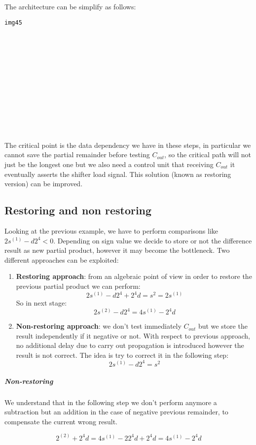 The architecture can be simplify as follows:

\begin{verbatim}
img45














\end{verbatim}

The critical point is the data dependency we have in these steps, in particular we cannot save the partial remainder before testing $C_{out}$, so the critical path will not just be the longest one but we also need a control unit that receiving $C_{out}$ it eventually asserts the shifter load signal. This solution (known as restoring version) can be improved.

\subsection{Restoring and non restoring}

Looking at the previous example, we have to perform comparisons like
$2s^{(1)}-d2^4 <0$. Depending on sign value we decide to store or not the difference result as new partial product, however it may become the bottleneck. Two different approaches can be exploited:

\begin{enumerate}
  \item \textbf{Restoring approach}: from an algebraic point of view in order to restore the previous partial product we can perform:
  $$ 2s^{(1)}-d2^4+2^4d=s^{2}=2s^{(1)}$$
  So in next stage:
  $$ 2s^{(2)}-d2^4=4s^{(1)}-2^4 d$$

  \item \textbf{Non-restoring approach}: we don't test immediately $C_{out}$ but we store the result independently if it negative or not. With respect to previous approach, no additional delay due to carry out propagation is introduced however the result is not correct. The idea is try to correct it in the following step:
  $$2s^{(1)}-d2^4=s^{2}$$
\end{enumerate}

\subparagraph{Non-restoring}
We understand that in the following step we don't perform anymore a subtraction but an addition in the case of negative previous remainder, to compensate the current wrong result.

$$2^{(2)}+2^4 d=4s^{(1)}-2 2^4 d + 2^4 d = 4s^{(1)} -2^4d$$

